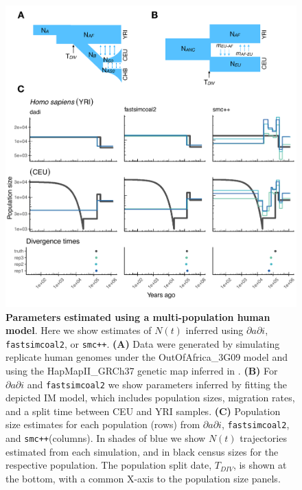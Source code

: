 \documentclass[12pt,halfline,a4paper]{ouparticle}
\newcommand{\dadi}{$\partial a \partial i$\xspace}
\newcommand{\smcpp}{\texttt{smc++}\xspace}
\newcommand{\fastsimcoal}{\texttt{fastsimcoal2}\xspace}
\begin{document}
\begin{figure}
\begin{center}
\includegraphics[width=0.7\linewidth]{display_items/homo_sapiens_two_pop_comp.pdf}
\caption{\textbf{Parameters estimated using a multi-population human model}.
Here we show estimates of $N(t)$ inferred using \dadi, \fastsimcoal, or \smcpp. \textbf{(A)} Data were generated by simulating
replicate human genomes under the OutOfAfrica\_3G09 model and using the HapMapII\_GRCh37 genetic map
inferred in \cite{international2007second}. \textbf{(B)} For \dadi and \fastsimcoal we show parameters inferred
by fitting the depicted IM model, which includes population sizes, migration rates, and a split
time between CEU and YRI samples. \textbf{(C)} Population size estimates for each population (rows)
from \dadi, \fastsimcoal, and \smcpp (columns).
In shades of blue we show $N(t)$ trajectories estimated from each simulation,
and in black census sizes for the respective population.
The population split date, $T_{DIV}$, is shown at
the bottom, with a common X-axis to the population size panels.}
\label{fig:IM_popn_human}
\end{center}
\end{figure}
\end{document}
